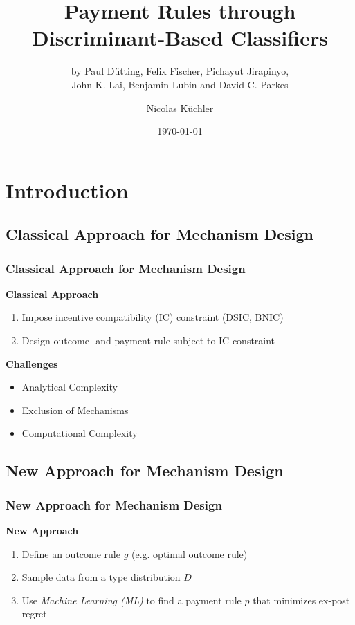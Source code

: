\documentclass{beamer}
\title[Payment Rules through Classifiers]{Payment Rules through Discriminant-Based Classifiers}
\subtitle{by Paul D\"utting, Felix Fischer, Pichayut Jirapinyo,\\
	John K. Lai, Benjamin Lubin and David C. Parkes}
\author{Nicolas K\"uchler} %
\institute[UZH] %
{
	University of Zurich \\ %
	\medskip
	\textit{nicolas.kuechler@uzh.ch}
}
\date{\today} %
\begin{document}
	
	
	\begin{frame}
		\titlepage %
	\end{frame}
	
	\section{Introduction}
	\subsection{Classical Approach for Mechanism Design}
	\begin{frame}
		\frametitle{Classical Approach for Mechanism Design}
		\textbf{Classical Approach}
		\begin{enumerate}	
			\pause[2]\item Impose incentive compatibility (IC) constraint (DSIC, BNIC)
			\pause[3]\item Design outcome- and payment rule subject to IC constraint
		\end{enumerate}
		\pause[1]
		\begin{center}
			
		\end{center}
		\pause[4]
		\textbf{Challenges}
		\begin{itemize}
			\item Analytical Complexity 
			\item Exclusion of Mechanisms
			\item Computational Complexity
		\end{itemize}
		
	\end{frame}
	
	\subsection{New Approach for Mechanism Design}
	\begin{frame}
		\frametitle{New Approach for Mechanism Design}
		\textbf{New Approach}
		\begin{enumerate}
			\pause[2]\item Define an outcome rule $g$ (e.g. optimal outcome rule)
			\pause[3]\item Sample data from a type distribution $D$
			\pause[4]\item Use \emph{Machine Learning (ML)} to find a payment rule $p$ that minimizes ex-post regret
		\end{enumerate}
		\pause[1]
		\begin{center}
			
		\end{center}
	\end{frame}	
	
\end{document}
